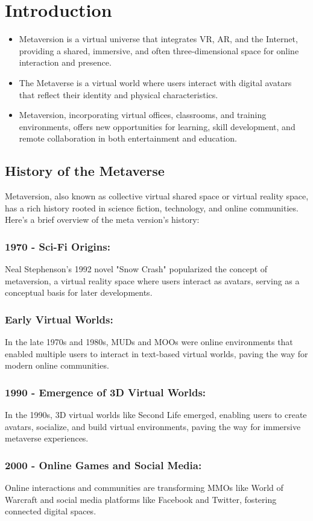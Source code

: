 \chapter{Introduction}
\label{sec:introduction}
\begin{itemize}
\item Metaversion is a virtual universe that integrates VR, AR, and the Internet, providing a shared, immersive, and often three-dimensional space for online interaction and presence.
\item The Metaverse is a virtual world where users interact with digital avatars that reflect their identity and physical characteristics.
\item Metaversion, incorporating virtual offices, classrooms, and training environments, offers new opportunities for learning, skill development, and remote collaboration in both entertainment and education.
\end{itemize}
\section{History of the Metaverse}
Metaversion, also known as collective virtual shared space or virtual reality space, has a rich history rooted in science fiction, technology, and online communities. Here's a brief overview of the meta version's history:
\subsection{1970 - Sci-Fi Origins:}
Neal Stephenson's 1992 novel "Snow Crash" popularized the concept of metaversion, a virtual reality space where users interact as avatars, serving as a conceptual basis for later developments.
\subsection{Early Virtual Worlds:}
In the late 1970s and 1980s, MUDs and MOOs were online environments that enabled multiple users to interact in text-based virtual worlds, paving the way for modern online communities.
\subsection{1990 - Emergence of 3D Virtual Worlds:}
In the 1990s, 3D virtual worlds like Second Life emerged, enabling users to create avatars, socialize, and build virtual environments, paving the way for immersive metaverse experiences.
\subsection{2000 - Online Games and Social Media:}
Online interactions and communities are transforming MMOs like World of Warcraft and social media platforms like Facebook and Twitter, fostering connected digital spaces.
